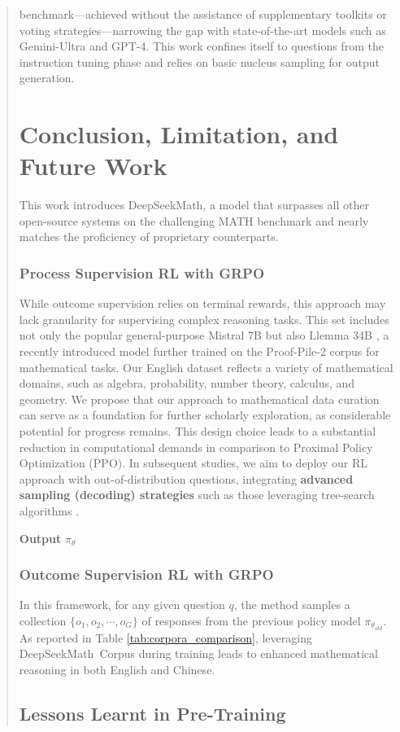 \begin{abstract}
\begin{itemize}[topsep=0pt]
\begin{algorithm}[t]
\begin{algorithmic}[1]
benchmark—achieved without the assistance of supplementary toolkits or voting strategies—narrowing the gap with state-of-the-art models such as Gemini-Ultra and GPT-4. This work confines itself to questions from the instruction tuning phase and relies on basic nucleus sampling for output generation. \section{Conclusion, Limitation, and Future Work} 

This work introduces DeepSeekMath, a model that surpasses all other open-source systems on the challenging MATH benchmark and nearly matches the proficiency of proprietary counterparts. \subsubsection{Process Supervision RL with GRPO} While outcome supervision relies on terminal rewards, this approach may lack granularity for supervising complex reasoning tasks. This set includes not only the popular general-purpose Mistral 7B \citep{mistral} but also Llemma 34B \citep{llemma}, a recently introduced model further trained on the Proof-Pile-2 corpus \citep{llemma} for mathematical tasks. Our English dataset reflects a variety of mathematical domains, such as algebra, probability, number theory, calculus, and geometry. We propose that our approach to mathematical data curation can serve as a foundation for further scholarly exploration, as considerable potential for progress remains. This design choice leads to a substantial reduction in computational demands in comparison to Proximal Policy Optimization (PPO). In subsequent studies, we aim to deploy our RL approach with out-of-distribution questions, integrating \textbf{advanced sampling (decoding) strategies} such as those leveraging tree-search algorithms \citep{yao2023tree}. \EndFor 
  \end{algorithmic}
  \textbf{Output} $\pi_\theta$
  \label{alg:iter-grpo}
\end{algorithm}

\subsubsection{Outcome Supervision RL with GRPO} In this framework, for any given question $q$, the method samples a collection $\{o_1, o_2, \cdots, o_G\}$ of responses from the previous policy model $\pi_{\theta_{old}}$. As reported in Table \ref{tab:corpora_comparison}, leveraging DeepSeekMath~Corpus during training leads to enhanced mathematical reasoning in both English and Chinese. \subsection{Lessons Learnt in Pre-Training}


\end{itemize}
\end{abstract}
